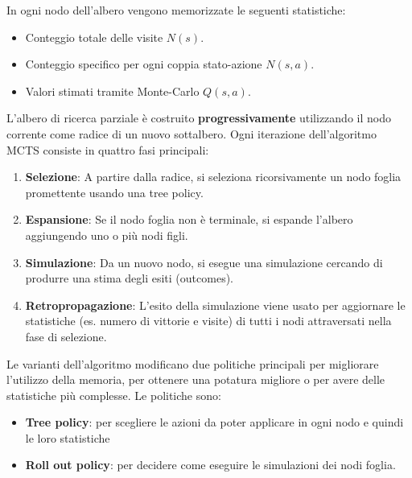 In ogni nodo dell'albero vengono memorizzate le seguenti statistiche:
\begin{itemize}
    \item Conteggio totale delle visite $N(s)$.
    \item Conteggio specifico per ogni coppia stato-azione $N(s, a)$.
    \item Valori stimati tramite Monte-Carlo $Q(s, a)$.
\end{itemize}

L'albero di ricerca parziale è costruito \textbf{progressivamente} utilizzando
il nodo corrente come radice di un nuovo sottalbero.
Ogni iterazione dell'algoritmo MCTS consiste in quattro fasi principali:
\begin{enumerate}
    \item \textbf{Selezione}: A partire dalla radice, si seleziona
    ricorsivamente un nodo foglia promettente usando una tree policy.
    \item \textbf{Espansione}: Se il nodo foglia non è terminale, si espande
    l'albero aggiungendo uno o più nodi figli.
    \item \textbf{Simulazione}: Da un nuovo nodo, si esegue una simulazione
    cercando di produrre una stima degli esiti (outcomes).
    \item \textbf{Retropropagazione}: L'esito della simulazione viene usato
    per aggiornare le statistiche (es. numero di vittorie e visite) di tutti
    i nodi attraversati nella fase di selezione.
\end{enumerate}

Le varianti dell'algoritmo modificano due politiche principali per migliorare
l'utilizzo della memoria, per ottenere una potatura migliore o per avere
delle statistiche più complesse.
Le politiche sono:
\begin{itemize}
    \item \textbf{Tree policy}: per scegliere le azioni da poter applicare in
    ogni nodo e quindi le loro statistiche
    \item \textbf{Roll out policy}: per decidere come eseguire le simulazioni
    dei nodi foglia.
\end{itemize}

